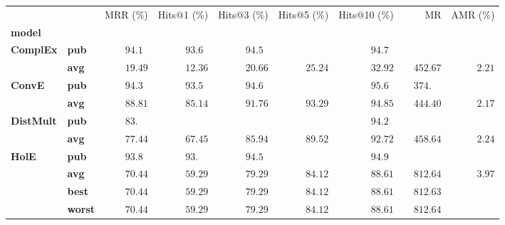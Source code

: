 \begin{tabular}{llrrrrrrr}
\toprule
       &     &           MRR (\%) &        Hits@1 (\%) &        Hits@3 (\%) &        Hits@5 (\%) &       Hits@10 (\%) &                              MR &            AMR (\%) \\
\textbf{model} & {} &                    &                    &                    &                    &                    &                                 &                     \\
\midrule
\textbf{ComplEx} & \textbf{pub} &  $94.1\phantom{0}$ &  $93.6\phantom{0}$ &  $94.5\phantom{0}$ &                    &  $94.7\phantom{0}$ &                                 &                     \\
       & \textbf{avg} &            $19.49$ &            $12.36$ &            $20.66$ &            $25.24$ &            $32.92$ &            $\phantom{00}452.67$ &  $\phantom{00}2.21$ \\
\textbf{ConvE} & \textbf{pub} &  $94.3\phantom{0}$ &  $93.5\phantom{0}$ &  $94.6\phantom{0}$ &                    &  $95.6\phantom{0}$ &  $\phantom{00}374.\phantom{00}$ &                     \\
       & \textbf{avg} &            $88.81$ &            $85.14$ &            $91.76$ &            $93.29$ &            $94.85$ &            $\phantom{00}444.40$ &  $\phantom{00}2.17$ \\
\textbf{DistMult} & \textbf{pub} &  $83.\phantom{00}$ &                    &                    &                    &  $94.2\phantom{0}$ &                                 &                     \\
       & \textbf{avg} &            $77.44$ &            $67.45$ &            $85.94$ &            $89.52$ &            $92.72$ &            $\phantom{00}458.64$ &  $\phantom{00}2.24$ \\
\textbf{HolE} & \textbf{pub} &  $93.8\phantom{0}$ &  $93.\phantom{00}$ &  $94.5\phantom{0}$ &                    &  $94.9\phantom{0}$ &                                 &                     \\
       & \textbf{avg} &            $70.44$ &            $59.29$ &            $79.29$ &            $84.12$ &            $88.61$ &            $\phantom{00}812.64$ &  $\phantom{00}3.97$ \\
       & \textbf{best} &            $70.44$ &            $59.29$ &            $79.29$ &            $84.12$ &            $88.61$ &            $\phantom{00}812.63$ &                     \\
       & \textbf{worst} &            $70.44$ &            $59.29$ &            $79.29$ &            $84.12$ &            $88.61$ &            $\phantom{00}812.64$ &                     \\

\end{tabular}

